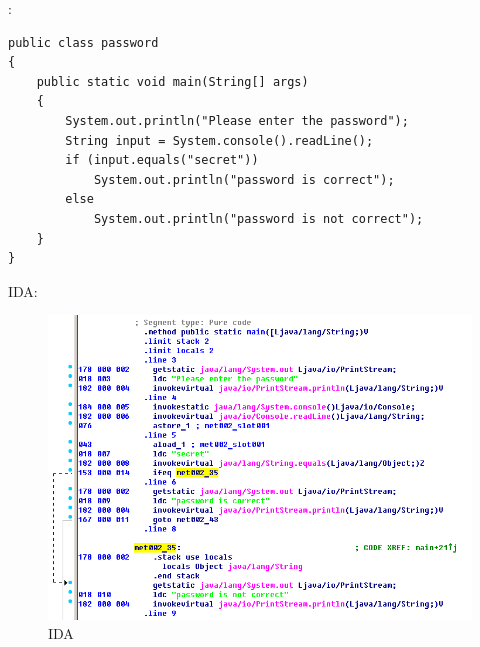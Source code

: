 
:

\begin{lstlisting}
public class password
{
	public static void main(String[] args)
	{
		System.out.println("Please enter the password");
		String input = System.console().readLine();
		if (input.equals("secret"))
			System.out.println("password is correct");
		else
			System.out.println("password is not correct");
	}
}
\end{lstlisting}

 IDA:

\begin{figure}[H]
\centering
\includegraphics[scale=\FigScale]{Java_and_NET/java/13_patching/2/1.png}
\caption{IDA}
\end{figure}

